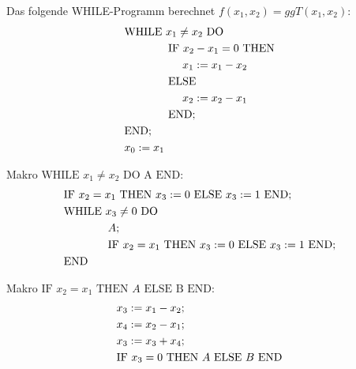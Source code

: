 \documentclass[a4]{exam}
\begin{document}
\begin{questions}
%
%
Das folgende WHILE-Programm berechnet $f(x_1,x_2) = ggT(x_1,x_2)$:
\begin{align}
&\text{WHILE } x_1 \ne x_2 \text{ DO} & \notag \\
&\phantom{WHILE }\text{IF } x_2 - x_1  = 0\text{ THEN} &\notag\\
&\phantom{WHILE IF} x_1:=  x_1-x_2 &\notag\\
&\phantom{WHILE }\text{ELSE } &\notag\\
&\phantom{WHILE IF} x_2 := x_2-x_1& \notag \\
&\phantom{WHILE }\text{END;} &\notag\\
&\text{END}; &\notag\\
&x_0 := x_1&\notag
\end{align}

Makro $\text{WHILE } x_1 \ne x_2 \text{ DO A END} $:
\begin{align}
&\text{IF } x_2 = x_1\text{ THEN } x_3 := 0 \text{ ELSE } x_3 := 1 \text{ END;}& \notag \\
&\text{WHILE }x_3 \ne 0 \text{ DO}& \notag \\
&\phantom{WHILE } A;&\notag\\
&\phantom{WHILE }\text{IF } x_2 = x_1\text{ THEN } x_3 := 0 \text{ ELSE } x_3 := 1 \text{ END;}& \notag \\
&\text{END}&\notag
\end{align}

Makro $ \text{IF } x_2 = x_1\text{ THEN } A \text{ ELSE B END} $:
\begin{align}
& x_3 := x_1 - x_2;& \notag \\
& x_4 := x_2 - x_1;& \notag \\
& x_3 := x_3 + x_4;& \notag \\
&\text{IF } x_3 = 0\text{ THEN } A \text{ ELSE } B \text{ END}& \notag 
\end{align}


\end{questions}
\end{document}
